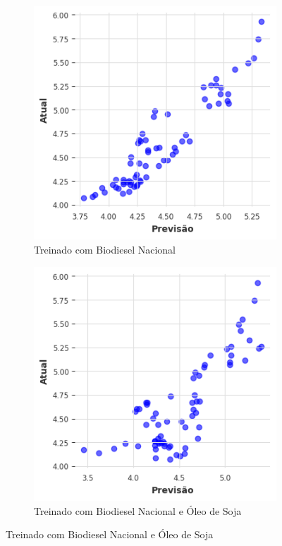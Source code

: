 \begin{figure}[htbp]
	\centering
	\begin{subfigure}[b]{0.40\textwidth}
		\centering
		\includegraphics[width=\textwidth]{figuras/imp_takens_brasil_scatter.png} %
		\caption{Treinado com Biodiesel Nacional \newline}
		\label{fig:imp_takens_brasil_scatter}
	\end{subfigure}
	\hfill
	\begin{subfigure}[b]{0.40\textwidth}
		\centering
		\includegraphics[width=\textwidth]{figuras/imp_takens_brasil_oil_scatter.png} %
		\caption{Treinado com Biodiesel Nacional e Óleo de Soja}
		\label{fig:imp_takens_brasil_oil_scatter}
	\end{subfigure}


\end{figure}
